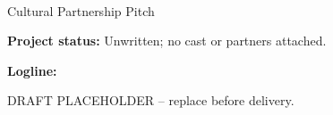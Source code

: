 \documentclass[11pt,letterpaper]{article}
\begin{document}
\begin{center}
{\Large\bfseries\sffamily \filmtitleupper}\\[6pt]
Cultural Partnership Pitch
\end{center}
\textbf{Project status:} Unwritten; no cast or partners attached.

\textbf{Logline:} \filmlogline

DRAFT PLACEHOLDER -- replace before delivery.
\end{document}
